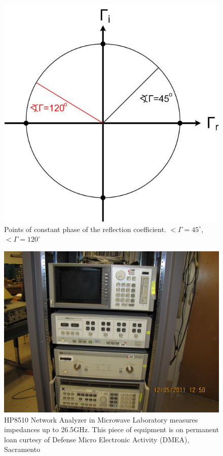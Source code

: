 \documentclass{ximera}
\begin{document}
\begin{figure}[htbp]
\begin{center}
\includegraphics[scale=0.3]{../jpg/smithchartangle.jpg}
\end{center}
\caption{Points of constant phase of the reflection coefficient. $ < \Gamma =45^\circ$, $  <  \Gamma = 120^\circ$}
\label{scswr}
\end{figure}






\begin{figure}[htbp]
\begin{center}
\includegraphics[scale=0.2]{../jpg/HP8510.jpg}
\end{center}
\caption{HP8510 Network Analyzer in Microwave Laboratory measures impedances up to 26.5GHz. This piece of equipment is on permanent loan curtesy of Defense Micro Electronic Activity (DMEA), Sacramento}
\label{hp8510}
\end{figure}
\end{document}
